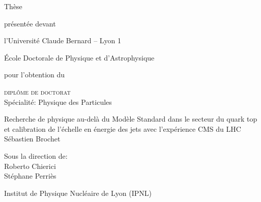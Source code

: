 \begin{titlepage}
\vspace*{-2cm}
\begin{center}
{\Large Thèse\\}

\vspace{1em}

{\small présentée devant\\}

\vspace{1em}

{\large l'Université Claude Bernard -- Lyon 1\\

\vspace{0.2em}

École Doctorale de Physique et d'Astrophysique\\}

\vspace{2.5em}

pour l'obtention du \\

\vspace{1.5em}

{\Large \textsc{diplôme de doctorat}\\
\small Spécialité: Physique des Particules}

\end{center}

\vspace{0.8em}

\begin{center} \LARGE
Recherche de physique au-delà du Modèle Standard dans le secteur du quark top et calibration de l'échelle en énergie des jets avec l'expérience CMS du LHC\\
\vspace{0.8em}
\Large Sébastien Brochet
\end{center}

\vspace{1.2em}

\begin{center}
\large
Sous la direction de:\\
Roberto Chierici\\
Stéphane Perriès
\end{center}

\begin{center}
\Large Institut de Physique Nucléaire de Lyon (IPNL)
\end{center}

\vspace{1em}


\end{titlepage}
